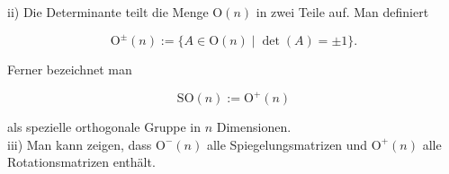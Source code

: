 \documentclass[10pt]{article}
\begin{document}
ii) Die Determinante teilt die Menge $\mathrm{O}(n)$ in zwei Teile auf. Man definiert


\begin{equation*}
\mathrm{O}^{ \pm}(n):=\{A \in \mathrm{O}(n) \mid \operatorname{det}(A)= \pm 1\} . \tag{6.132}
\end{equation*}


Ferner bezeichnet man


\begin{equation*}
\mathrm{SO}(n):=\mathrm{O}^{+}(n) \tag{6.133}
\end{equation*}


als spezielle orthogonale Gruppe in $n$ Dimensionen.\\
iii) Man kann zeigen, dass $\mathrm{O}^{-}(n)$ alle Spiegelungsmatrizen und $\mathrm{O}^{+}(n)$ alle Rotationsmatrizen enthält.
\end{document}
